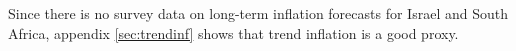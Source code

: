 {Since there is no survey data on long-term inflation forecasts for Israel and South Africa, appendix \ref{sec:trendinf} shows that trend inflation is a good proxy.




%	
%	
%	


%


}
